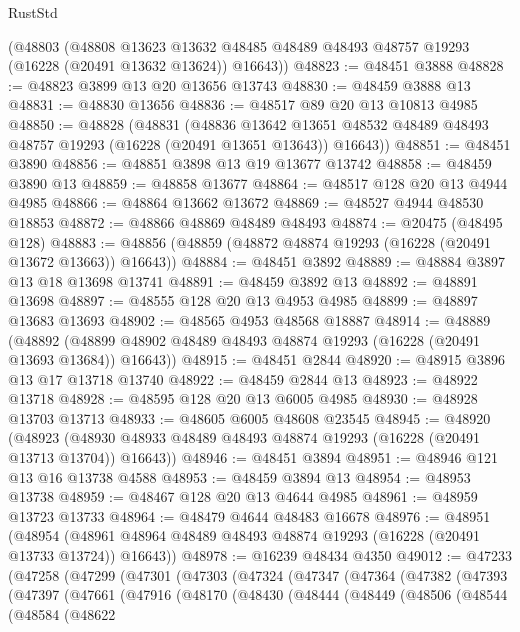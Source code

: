 \begin{lexlean}{RustStd}
\begin{coremodule}
    (@48803
      (@48808
        @13623
        @13632
        @48485
        @48489
        @48493
        @48757
        @19293
        (@16228 (@20491 @13632 @13624))
        @16643))
@48823 := @48451 @3888
@48828 := @48823 @3899 @13 @20 @13656 @13743
@48830 := @48459 @3888 @13
@48831 := @48830 @13656
@48836 := @48517 @89 @20 @13 @10813 @4985
@48850 := @48828
    (@48831
      (@48836
        @13642
        @13651
        @48532
        @48489
        @48493
        @48757
        @19293
        (@16228 (@20491 @13651 @13643))
        @16643))
@48851 := @48451 @3890
@48856 := @48851 @3898 @13 @19 @13677 @13742
@48858 := @48459 @3890 @13
@48859 := @48858 @13677
@48864 := @48517 @128 @20 @13 @4944 @4985
@48866 := @48864 @13662 @13672
@48869 := @48527 @4944 @48530 @18853
@48872 := @48866 @48869 @48489 @48493
@48874 := @20475 (@48495 @128)
@48883 := @48856 (@48859 (@48872 @48874 @19293 (@16228 (@20491 @13672 @13663)) @16643))
@48884 := @48451 @3892
@48889 := @48884 @3897 @13 @18 @13698 @13741
@48891 := @48459 @3892 @13
@48892 := @48891 @13698
@48897 := @48555 @128 @20 @13 @4953 @4985
@48899 := @48897 @13683 @13693
@48902 := @48565 @4953 @48568 @18887
@48914 := @48889
    (@48892 (@48899 @48902 @48489 @48493 @48874 @19293 (@16228 (@20491 @13693 @13684)) @16643))
@48915 := @48451 @2844
@48920 := @48915 @3896 @13 @17 @13718 @13740
@48922 := @48459 @2844 @13
@48923 := @48922 @13718
@48928 := @48595 @128 @20 @13 @6005 @4985
@48930 := @48928 @13703 @13713
@48933 := @48605 @6005 @48608 @23545
@48945 := @48920
    (@48923 (@48930 @48933 @48489 @48493 @48874 @19293 (@16228 (@20491 @13713 @13704)) @16643))
@48946 := @48451 @3894
@48951 := @48946 @121 @13 @16 @13738 @4588
@48953 := @48459 @3894 @13
@48954 := @48953 @13738
@48959 := @48467 @128 @20 @13 @4644 @4985
@48961 := @48959 @13723 @13733
@48964 := @48479 @4644 @48483 @16678
@48976 := @48951
    (@48954 (@48961 @48964 @48489 @48493 @48874 @19293 (@16228 (@20491 @13733 @13724)) @16643))
@48978 := @16239 @48434 @4350
@49012 := @47233
    (@47258
      (@47299
        (@47301
          (@47303
            (@47324
              (@47347
                (@47364
                  (@47382
                    (@47393
                      (@47397
                        (@47661
                          (@47916
                            (@48170
                              (@48430
                                (@48444
                                  (@48449
                                    (@48506
                                      (@48544
                                        (@48584
                                          (@48622

\end{coremodule}
\end{lexlean}
